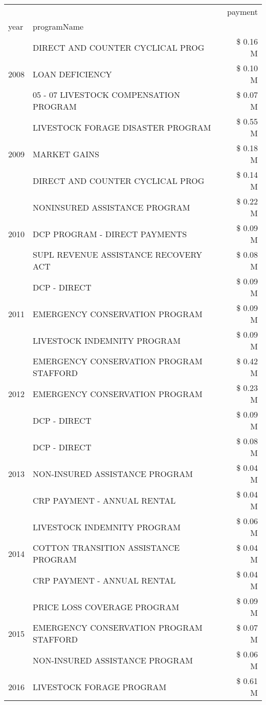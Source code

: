 \begin{tabular}{llr}
\toprule
 &  & payment \\
year & programName &  \\
\midrule
\multirow[t]{3}{*}{2008} & DIRECT AND COUNTER CYCLICAL PROG & \$ 0.16 M \\
 & LOAN DEFICIENCY & \$ 0.10 M \\
 & 05 - 07 LIVESTOCK COMPENSATION PROGRAM & \$ 0.07 M \\
\cline{1-3}
\multirow[t]{3}{*}{2009} & LIVESTOCK FORAGE DISASTER  PROGRAM & \$ 0.55 M \\
 & MARKET GAINS & \$ 0.18 M \\
 & DIRECT AND COUNTER CYCLICAL PROG & \$ 0.14 M \\
\cline{1-3}
\multirow[t]{3}{*}{2010} & NONINSURED ASSISTANCE PROGRAM & \$ 0.22 M \\
 & DCP PROGRAM - DIRECT PAYMENTS & \$ 0.09 M \\
 & SUPL REVENUE ASSISTANCE RECOVERY ACT & \$ 0.08 M \\
\cline{1-3}
\multirow[t]{3}{*}{2011} & DCP - DIRECT & \$ 0.09 M \\
 & EMERGENCY CONSERVATION PROGRAM & \$ 0.09 M \\
 & LIVESTOCK INDEMNITY PROGRAM & \$ 0.09 M \\
\cline{1-3}
\multirow[t]{3}{*}{2012} & EMERGENCY CONSERVATION PROGRAM STAFFORD & \$ 0.42 M \\
 & EMERGENCY CONSERVATION PROGRAM & \$ 0.23 M \\
 & DCP - DIRECT & \$ 0.09 M \\
\cline{1-3}
\multirow[t]{3}{*}{2013} & DCP - DIRECT & \$ 0.08 M \\
 & NON-INSURED ASSISTANCE PROGRAM & \$ 0.04 M \\
 & CRP PAYMENT - ANNUAL RENTAL & \$ 0.04 M \\
\cline{1-3}
\multirow[t]{3}{*}{2014} & LIVESTOCK INDEMNITY PROGRAM & \$ 0.06 M \\
 & COTTON TRANSITION ASSISTANCE PROGRAM & \$ 0.04 M \\
 & CRP PAYMENT - ANNUAL RENTAL & \$ 0.04 M \\
\cline{1-3}
\multirow[t]{3}{*}{2015} & PRICE LOSS COVERAGE PROGRAM & \$ 0.09 M \\
 & EMERGENCY CONSERVATION PROGRAM STAFFORD & \$ 0.07 M \\
 & NON-INSURED ASSISTANCE PROGRAM & \$ 0.06 M \\
\cline{1-3}
\multirow[t]{3}{*}{2016} & LIVESTOCK FORAGE PROGRAM                      & \$ 0.61 M \\

\end{tabular}
